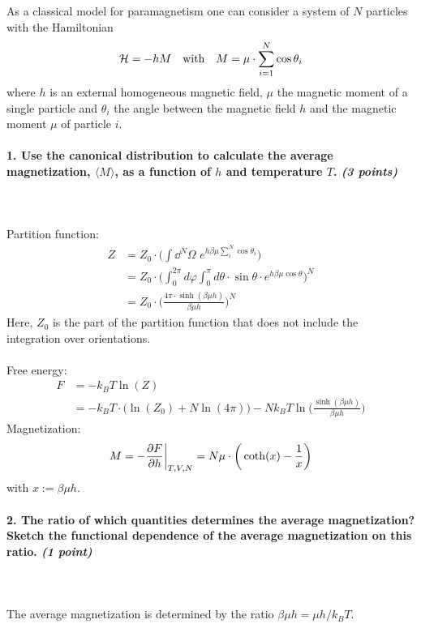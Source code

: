 As a classical model for paramagnetism one 
can consider a system of $N$ particles with 
the Hamiltonian
\begin{equation}
    \mathcal{H}=-hM
    \ \ \ \textnormal{with}\ \ \ 
    M=\mu\cdot\sum_{i=1}^N\cos\theta_i
\end{equation}
where $h$ is an external homogeneous magnetic 
field, $\mu$ the magnetic moment of a single 
particle and $\theta_i$ the angle between the
magnetic field $h$ and the magnetic moment
$\mu$ of particle $i$.

\paragraph{1. Use the canonical distribution 
    to calculate the average magnetization, 
    $\langle M\rangle$, as a function of $h$
    and temperature $T$. 
    \textit{(3 points)}
} \ \\
    \\
    Partition function:
    \begin{align}
        Z
        &=Z_0\cdot\bigg(
            \int \dd^N\Omega \, \,
            e^{h\beta\mu\sum_i^N\cos\theta_i}
            \bigg) \\
        &=Z_0\cdot\bigg(
            \int_0^{2\pi}d\varphi 
            \int_0^\pi d\theta
            \cdot\sin\theta\cdot 
            e^{h\beta\mu\cos\theta}
    \bigg)^N \\
        &=Z_0\cdot\bigg(
            \frac{4\pi\cdot\sinh(\beta\mu h)}
            {\beta\mu h}
        \bigg)^N
    \end{align}
    Here, $Z_0$ is the part of the partition 
    function that does not include the 
    integration over orientations. \\
    \\
    Free energy:
    \begin{align}
        F
        &=-k_BT\ln(Z) \\
        &=-k_BT\cdot\bigg(
            \ln(Z_0)+N\ln(4\pi)
        \bigg)-Nk_BT\ln\bigg(
            \frac{\sinh(\beta\mu h)}{\beta\mu h}
        \bigg)
    \end{align}
    Magnetization:
    \begin{align}
        M
        =-\frac{\partial F}{\partial h}\bigg|_{T,V,N}
        =N\mu\cdot\bigg(\coth(x)
        -\frac{1}{x}\bigg)
    \end{align}
    with $x:=\beta\mu h$.

\newpage
\paragraph{2. The ratio of which quantities 
    determines the average magnetization? 
    Sketch the functional dependence of the 
    average magnetization on this ratio. 
    \textit{(1 point)}
} \ \\
    \\
    The average magnetization is determined by 
    the ratio $\beta\mu h=\mu h/k_BT$.

